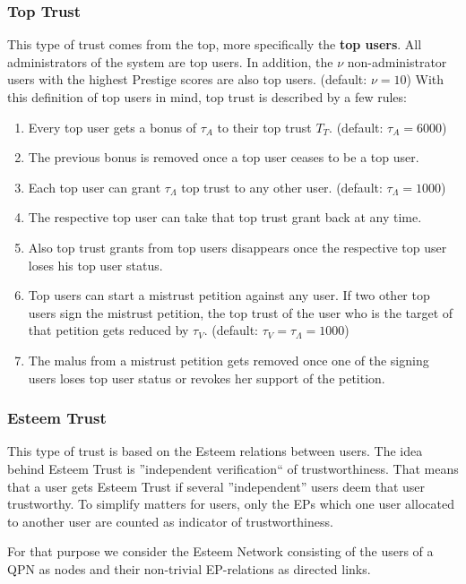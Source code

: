 \documentclass[a4paper,12pt]{scrartcl}
\begin{document}
\subsubsection{Top Trust}
This type of trust comes from the top, more specifically the \textbf{top users}. All administrators of the system are top users. In addition, the $\nu$ non-administrator users with the highest Prestige scores are also top users. (default: $\nu = 10$) 
With this definition of top users in mind, top trust is described by a few rules:

\begin{enumerate}
 \item Every top user gets a bonus of $\tau_{A}$ to their top trust $T_T$. (default: $\tau_{A} = 6000$)
 \item The previous bonus is removed once a top user ceases to be a top user.
 \item Each top user can grant $\tau_{\Lambda}$ top trust to any other user. (default: $\tau_{\Lambda} = 1000$)
 \item The respective top user can take that top trust grant back at any time.
 \item Also top trust grants from top users disappears once the respective top user loses his top user status.
 \item Top users can start a mistrust petition against any user. If two other top users sign the mistrust petition, the top trust of the user who is the target of that petition gets reduced by $\tau_{V}$. (default: $\tau_{V} = \tau_{\Lambda} = 1000$)
 \item The malus from a mistrust petition gets removed once one of the signing users loses top user status or revokes her support of the petition.
\end{enumerate}

\subsubsection{Esteem Trust}
This type of trust is based on the Esteem relations between users. The idea behind Esteem Trust is ''independent verification`` of trustworthiness. That means that a user gets Esteem Trust if several ''independent'' users deem that user trustworthy. To simplify matters for users, only the EPs which one user allocated to another user are counted as indicator of trustworthiness.

For that purpose we consider the Esteem Network consisting of the users of a QPN as nodes and their non-trivial EP-relations as directed links.
\end{document}
